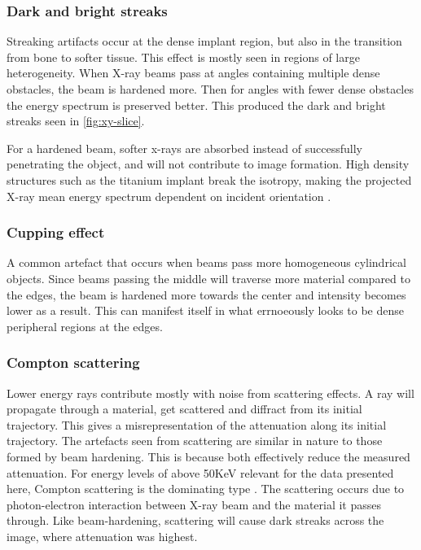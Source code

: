 \subsubsection{Dark and bright streaks}

Streaking artifacts occur at the dense implant region, but also in the transition from bone to softer
tissue. This effect is mostly seen in regions of large heterogeneity. When X-ray beams pass at angles
containing multiple dense obstacles, the beam is hardened more. Then for angles with fewer dense
obstacles the energy spectrum is preserved better. This produced the dark and bright streaks seen in
\cref{fig:xy-slice}.

For a hardened beam, softer x-rays are absorbed instead of successfully penetrating the object,
and will not contribute to image formation. High density structures such as the titanium implant
break the isotropy, making the projected X-ray mean energy spectrum dependent on incident orientation
\citep{srnoise}.

\subsubsection{Cupping effect}

A common artefact that occurs when beams pass more homogeneous cylindrical objects. Since beams
passing the middle will traverse more material compared to the edges, the beam is hardened more
towards the center and intensity becomes lower as a result. This can manifest itself in what
errnoeously looks to be dense peripheral regions at the edges.

\subsubsection{Compton scattering}

Lower energy rays contribute mostly with noise from scattering effects. A ray will propagate through a
material, get scattered and diffract from its initial trajectory. This gives a misrepresentation of
the attenuation along its initial trajectory. The artefacts seen from scattering are similar in
nature to those formed by beam hardening. This is because both effectively reduce the measured
attenuation. For energy levels of above 50KeV relevant for the data presented here, Compton
scattering is the dominating type \citep{compton}. The scattering occurs due to photon-electron
interaction between X-ray beam and the material it passes through. Like beam-hardening, scattering
will cause dark streaks across the image, where attenuation was highest.

